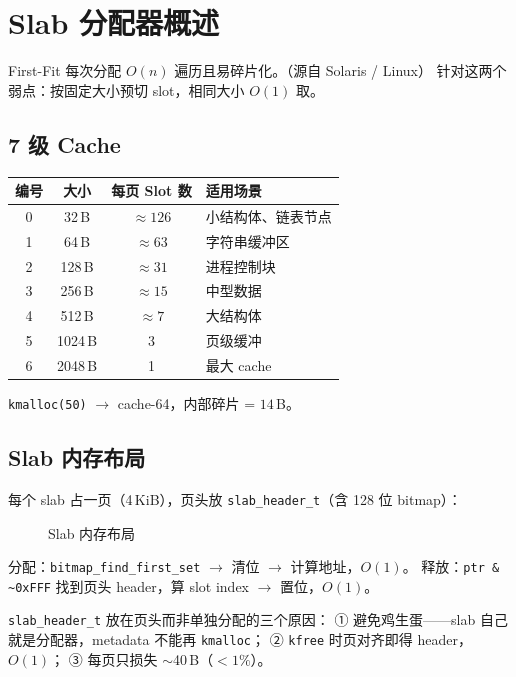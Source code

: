 \section{Slab 分配器概述}
\label{sec:slab-overview}

First-Fit 每次分配 $O(n)$ 遍历且易碎片化。（源自 Solaris / Linux）
针对这两个弱点：按固定大小预切 slot，相同大小 $O(1)$ 取。

\subsection{7 级 Cache}

\begin{center}
\begin{tabular}{c c c l}
\toprule
编号 & 大小 & 每页 Slot 数 & 适用场景 \\
\midrule
0 & 32\,B  & $\approx 126$ & 小结构体、链表节点 \\
1 & 64\,B  & $\approx 63$  & 字符串缓冲区 \\
2 & 128\,B & $\approx 31$  & 进程控制块 \\
3 & 256\,B & $\approx 15$  & 中型数据 \\
4 & 512\,B & $\approx 7$   & 大结构体 \\
5 & 1024\,B & 3            & 页级缓冲 \\
6 & 2048\,B & 1            & 最大 cache \\
\bottomrule
\end{tabular}
\end{center}

\texttt{kmalloc(50)} $\to$ cache-64，内部碎片 = $14$\,B。

\subsection{Slab 内存布局}

每个 slab 占一页（4\,KiB），页头放 \texttt{slab\_header\_t}（含 128 位 bitmap）：

\begin{figure}[H]
  \centering
  
  \caption{Slab 内存布局}
  \label{fig:slab-layout}
\end{figure}

分配：\texttt{bitmap\_find\_first\_set} $\to$ 清位 $\to$ 计算地址，$O(1)$。
释放：\texttt{ptr \& \~{}0xFFF} 找到页头 header，算 slot index $\to$ 置位，$O(1)$。

\begin{designbox}
\texttt{slab\_header\_t} 放在页头而非单独分配的三个原因：
① 避免鸡生蛋——slab 自己就是分配器，metadata 不能再 \texttt{kmalloc}；
② \texttt{kfree} 时页对齐即得 header，$O(1)$；
③ 每页只损失 $\sim$40\,B（$<1\%$）。
\end{designbox}


